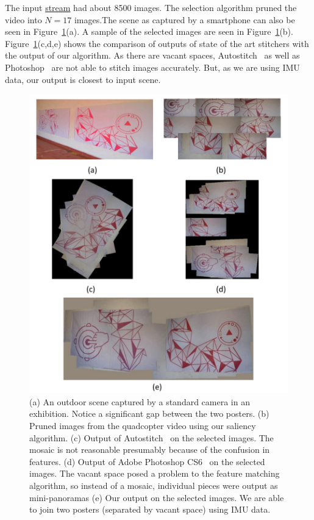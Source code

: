 \documentclass[10pt,twocolumn,letterpaper]{article}
\begin{document}
\vspace{4 mm}

The input \href{videos/purpleRed.avi}{stream} had about 8500 images. The
selection algorithm pruned the video into $N=17$ images.The scene as captured by a smartphone can also be seen in
Figure~\ref{fig:results2}(a). A sample of the
selected images are seen in Figure~\ref{fig:results2}(b).
Figure~\ref{fig:results2}(c,d,e) shows the comparison of outputs of state
of the art stitchers with the output of our algorithm. As there are vacant
spaces, Autostitch~\cite{autostitch} as well as Photoshop~\cite{photoshop} are
not able to stitch images accurately. But, as we are using IMU data, our output is closest to input scene.

\begin{figure}[h!]
\centering
\includegraphics[width=0.85\linewidth]{figures/Purple_red.pdf}
\caption{(a) An outdoor scene captured by a standard camera in an
  exhibition. Notice a   significant gap between the two posters.  (b) Pruned
  images from the quadcopter video using our saliency algorithm. (c) Output of
  Autostitch~\cite{autostitch} on the selected images. The mosaic is not
  reasonable presumably because of the confusion in features. (d) Output of Adobe
  Photoshop CS6~\cite{photoshop} on the selected images. The vacant space posed a
  problem to the feature matching algorithm, so instead of a mosaic,
  individual pieces were output as mini-panoramas (e) Our output on
  the selected images. We are able to join two posters (separated by
  vacant space) using IMU data.}
\label{fig:results2}
\end{figure}
		

	
\end{document}
